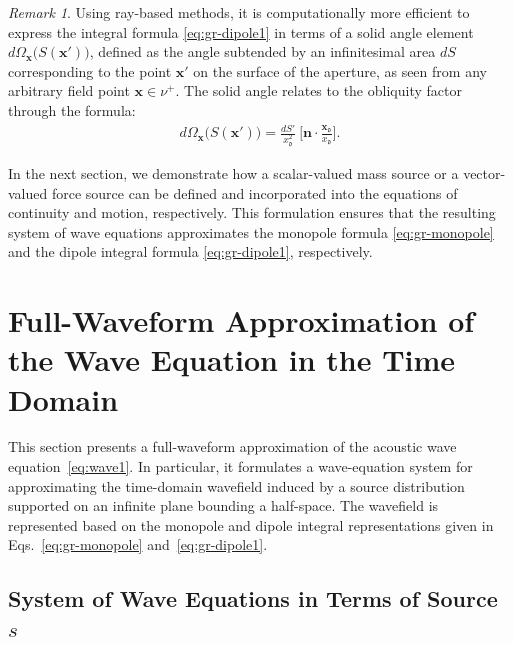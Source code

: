 \documentclass[11pt,reqno]{amsart}
\theoremstyle{remark}
\newtheorem{remark}{Remark}
\theoremstyle{italic_lemma}
\newcommand{\bx}{\boldsymbol{x}}
\newcommand{\bn}{\boldsymbol{n}}
\newcommand{\fd}{\mathfrak{d}}
\begin{document}
\begin{remark}
Using ray-based methods, it is computationally more efficient to express the integral formula \eqref{eq:gr-dipole1} in terms of a solid angle element $d \Omega_{\bx}\big(S(\bx')\big)$, defined as the angle subtended by an infinitesimal area $dS$ corresponding to the point $\bx'$ on the surface of the aperture, as seen from any arbitrary field point $\bx \in \nu^+$. The solid angle relates to the obliquity factor through the formula:
\begin{align} \label{eq:solid}
    d  \Omega_{\bx}\big(S(\bx')\big) = \frac{dS'}{x_{\fd}^2} \ \Big[ \bn \cdot \frac{\bx_{\fd}}{x_{\fd}} \Big].
\end{align}
\end{remark}

In the next section, we demonstrate how a scalar-valued mass source or a vector-valued force source can be defined and incorporated into the equations of continuity and motion, respectively. This formulation ensures that the resulting system of wave equations approximates the monopole formula \eqref{eq:gr-monopole} and the dipole integral formula \eqref{eq:gr-dipole1}, respectively.


\section{Full-Waveform Approximation of the Wave Equation in the Time Domain}
\label{sec:approx}

\noindent
This section presents a full-waveform approximation of the acoustic wave equation~\eqref{eq:wave1}. In particular, it formulates a wave-equation system for approximating the time-domain wavefield induced by a source distribution supported on an infinite plane bounding a half-space. The wavefield is represented based on the monopole and dipole integral representations given in Eqs.~\eqref{eq:gr-monopole} and~\eqref{eq:gr-dipole1}.


\subsection{System of Wave Equations in Terms of Source \( s \)}
\label{sec:semi-num-s}
\end{document}
